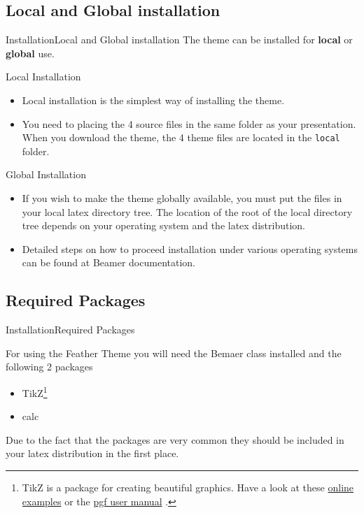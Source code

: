 \documentclass[10pt]{beamer}
\newcommand{\chref}[2]{
  \href{#1}{{\usebeamercolor[bg]{Feather}#2}}
}
\begin{document}
\subsection{Local and Global installation}
\begin{frame}{Installation}{Local and Global installation}
  The theme can be installed for \textbf{local} or \textbf{global} use.
  \pause
  \begin{block}{Local Installation}
  \begin{itemize}    
    \item Local installation is the simplest way of installing the theme. 
    \item You need to placing the 4 source files in the same folder as your presentation. When you download the theme, the 4 theme files are located in the {\tt local} folder.
  \end{itemize}
  \end{block}

  \begin{block}{Global Installation}
  \begin{itemize}
     \item If you wish to make the theme globally available, you must put the files in your local latex directory tree. The location of the root of the local directory tree depends on your operating system and the latex distribution. 
     \item Detailed steps on how to proceed installation under various operating systems can be found at Beamer documentation.
  \end{itemize}
  \end{block}
\end{frame}
     

\subsection{Required Packages}
\begin{frame}{Installation}{Required Packages}

  For using the Feather Theme you will need the Bemaer class installed and the following 2 packages
  \begin{itemize}
    \item TikZ\footnote{TikZ is a package for creating beautiful graphics. Have a look at these \chref{http://www.texample.net/tikz/examples/}{online examples} or the \chref{http://tug.ctan.org/tex-archive/graphics/pgf/base/doc/generic/pgf/pgfmanual.pdf}{pgf user manual}.}
    \item calc
  \end{itemize}
  Due to the fact that the packages are very common they should be included in your latex distribution in the first place.
\end{frame}
\end{document}
